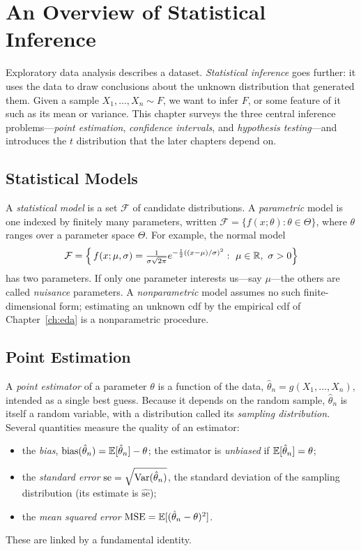 \chapter{An Overview of Statistical Inference}
\label{ch:inference}

Exploratory data analysis describes a dataset. \emph{Statistical inference} goes
further: it uses the data to draw conclusions about the unknown distribution that
generated them. Given a sample $X_1,\dots,X_n\sim F$, we want to infer $F$, or
some feature of it such as its mean or variance. This chapter surveys the three
central inference problems—\emph{point estimation}, \emph{confidence intervals},
and \emph{hypothesis testing}—and introduces the $t$ distribution that the later
chapters depend on.

\section{Statistical Models}

A \emph{statistical model} is a set $\mathcal F$ of candidate distributions. A
\emph{parametric} model is one indexed by finitely many parameters, written
$\mathcal F=\{f(x;\theta):\theta\in\Theta\}$, where $\theta$ ranges over a
parameter space $\Theta$. For example, the normal model
\[
  \mathcal F=\Bigl\{\,f(x;\mu,\sigma)=\tfrac{1}{\sigma\sqrt{2\pi}}e^{-\frac12((x-\mu)/\sigma)^2}:\ \mu\in\R,\ \sigma>0\Bigr\}
\]
has two parameters. If only one parameter interests us—say $\mu$—the others are
called \emph{nuisance} parameters. A \emph{nonparametric} model assumes no such
finite-dimensional form; estimating an unknown cdf by the empirical cdf of
Chapter~\ref{ch:eda} is a nonparametric procedure.

\section{Point Estimation}

A \emph{point estimator} of a parameter $\theta$ is a function of the data,
$\hat\theta_n=g(X_1,\dots,X_n)$, intended as a single best guess. Because it
depends on the random sample, $\hat\theta_n$ is itself a random variable, with a
distribution called its \emph{sampling distribution}. Several quantities measure
the quality of an estimator:
\begin{itemize}[leftmargin=1.4em,topsep=2pt,itemsep=1pt]
  \item the \emph{bias}, $\mathrm{bias}(\hat\theta_n)=\mathbb{E}[\hat\theta_n]-\theta$;
        the estimator is \emph{unbiased} if $\mathbb{E}[\hat\theta_n]=\theta$;
  \item the \emph{standard error} $\mathrm{se}=\sqrt{\mathrm{Var}(\hat\theta_n)}$, the
        standard deviation of the sampling distribution (its estimate is
        $\widehat{\mathrm{se}}$);
  \item the \emph{mean squared error}
        $\mathrm{MSE}=\mathbb{E}[(\hat\theta_n-\theta)^2]$.
\end{itemize}
These are linked by a fundamental identity.

